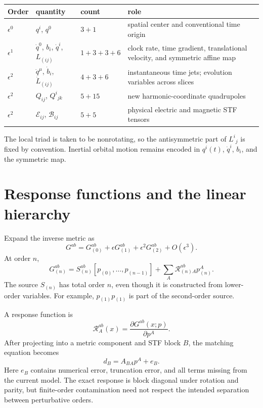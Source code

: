 \documentclass[11pt]{article}
\newcommand{\eps}{\epsilon}
\newcommand{\G}{G}
\newcommand{\Rop}{\mathcal R}
\newcommand{\E}{\mathcal E}
\newcommand{\B}{\mathcal B}
\begin{document}
\begin{center}
\small
\begin{tabularx}{0.96\textwidth}{
  >{\raggedright\arraybackslash}p{}
  >{\raggedright\arraybackslash}p{}
  >{\centering\arraybackslash}p{}X}
\toprule
\textbf{Order} & \textbf{quantity} & \textbf{count} & \textbf{role}\\
\midrule
\(\eps^0\) & \(q^i\), \(q^0\) & \(3+1\) &
spatial center and conventional time origin\\
\(\eps^1\) & \(\dot q^0\), \(b_i\), \(\dot q^i\), \(L_{(ij)}\) &
\(1+3+3+6\) & clock rate, time gradient, translational velocity, and
symmetric affine map\\
\(\eps^2\) & \(\ddot q^\mu\), \(\dot b_i\), \(\dot L_{(ij)}\) &
\(4+3+6\) & instantaneous time jets; evolution variables across slices\\
\(\eps^2\) & \(Q_{ij}\), \(Q^i{}_{jk}\) & \(5+15\) &
new harmonic-coordinate quadrupoles\\
\(\eps^2\) & \(\E_{ij}\), \(\B_{ij}\) & \(5+5\) &
physical electric and magnetic STF tensors\\
\bottomrule
\end{tabularx}
\end{center}

The local triad is taken to be nonrotating, so the antisymmetric part of
\(L^i{}_j\) is fixed by convention.  Inertial orbital motion remains encoded
in \(q^i(t)\), \(\dot q^i\), \(b_i\), and the symmetric map.

\section{Response functions and the linear hierarchy}

Expand the inverse metric as
\begin{equation}
\G^{ab}
=\G_{(0)}^{ab}
+\eps\G_{(1)}^{ab}
+\eps^2\G_{(2)}^{ab}
+O(\eps^3).
\end{equation}
At order \(n\),
\begin{equation}
\G_{(n)}^{ab}
=S_{(n)}^{ab}[p_{(0)},\ldots,p_{(n-1)}]
+\sum_A\Rop_{(n)A}^{ab}p_{(n)}^A.
\label{eq:order-response}
\end{equation}
The source \(S_{(n)}\) has total order \(n\), even though it is constructed
from lower-order variables.  For example, \(p_{(1)}p_{(1)}\) is part of the
second-order source.

A response function is
\begin{equation}
\Rop_A^{ab}(x)
=\frac{\partial \G^{ab}(x;p)}{\partial p^A}.
\end{equation}
After projecting into a metric component and STF block \(B\), the matching
equation becomes
\begin{equation}
d_B=A_{BA}p^A+e_B.
\label{eq:block-system}
\end{equation}
Here \(e_B\) contains numerical error, truncation error, and all terms missing
from the current model.  The exact response is block diagonal under rotation
and parity, but finite-order contamination need not respect the intended
separation between perturbative orders.
\end{document}
